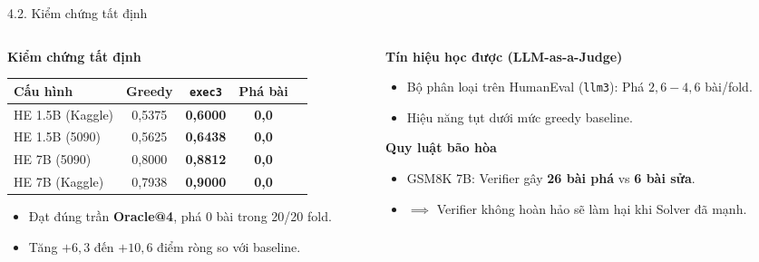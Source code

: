 \documentclass[aspectratio=169,10pt]{beamer}
\begin{document}
\begin{frame}{4.2. Kiểm chứng tất định}
  \begin{columns}[t]
    \begin{column}{0.50\textwidth}
      \begin{block}{\textbf{Kiểm chứng tất định}}
        \centering\footnotesize
        \begin{tabular}{lcccc}\toprule
          \textbf{Cấu hình} & \textbf{Greedy} & \textbf{\texttt{exec3}} & \textbf{Phá bài}\\\midrule
          HE 1.5B (Kaggle) & 0,5375 & \textbf{0,6000} & \textbf{0,0}\\
          HE 1.5B (5090)   & 0,5625 & \textbf{0,6438} & \textbf{0,0}\\
          HE 7B (5090)     & 0,8000 & \textbf{0,8812} & \textbf{0,0}\\
          HE 7B (Kaggle)   & 0,7938 & \textbf{0,9000} & \textbf{0,0}\\\bottomrule
        \end{tabular}
        \vspace{4pt}
        \begin{itemize}\scriptsize
          \item Đạt đúng trần \textbf{Oracle@4}, phá $0$ bài trong 20/20 fold.
          \item Tăng $+6{,}3$ đến $+10{,}6$ điểm ròng so với baseline.
        \end{itemize}
      \end{block}
    \end{column}
    
    \begin{column}{0.46\textwidth}
      \begin{alertblock}{\textbf{Tín hiệu học được (LLM-as-a-Judge)}}
        \begin{itemize}\small
          \item Bộ phân loại trên HumanEval (\texttt{llm3}): Phá $2{,}6 - 4{,}6$ bài/fold.
          \item Hiệu năng tụt dưới mức greedy baseline.
        \end{itemize}
      \end{alertblock}
      
      \begin{block}{\textbf{Quy luật bão hòa}}
        \begin{itemize}\small
          \item GSM8K 7B: Verifier gây \textbf{26 bài phá} vs \textbf{6 bài sửa}.
          \item $\implies$ Verifier không hoàn hảo sẽ làm hại khi Solver đã mạnh.
        \end{itemize}
      \end{block}
    \end{column}
  \end{columns}
\end{frame}
\end{document}
